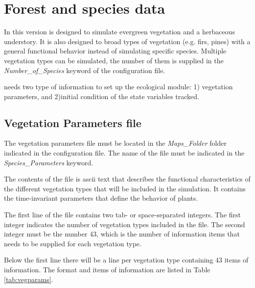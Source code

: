 \section{Forest and species data} 

In this version \echo is designed to simulate evergreen vegetation and a herbaceous understory. It is also designed to broad types of vegetation (e.g.  firs, pines) with a general functional behavior instead of simulating specific species. Multiple vegetation types can be simulated, the number of them is supplied in the \emph{Number\_of\_Species} keyword of the configuration file.

\echo needs two type of information to set up the ecological module: 1) vegetation parameters, and 2)initial condition of the state variables tracked. 

\subsection{Vegetation Parameters file}
The vegetation parameters file must be located in the \emph{Maps\_Folder} folder indicated in the configuration file. The name of the file must be indicated in the \emph{Species\_Parameters} keyword. 

The contents of the file is ascii text that describes the functional characteristics of the different vegetation types that will be included in the simulation. It contains the time-invariant parameters that define the behavior of plants.

The first line of the file contains two tab- or space-separated integers. The first integer indicates the number of vegetation types included in the file. The second integer must be the number 43, which is the number of information items that needs to be supplied for each vegetation type. 

Below the first line there will be a line per vegetation type containing 43 items of information. The format and items of information are listed in Table \ref{tab:vegparams}.

